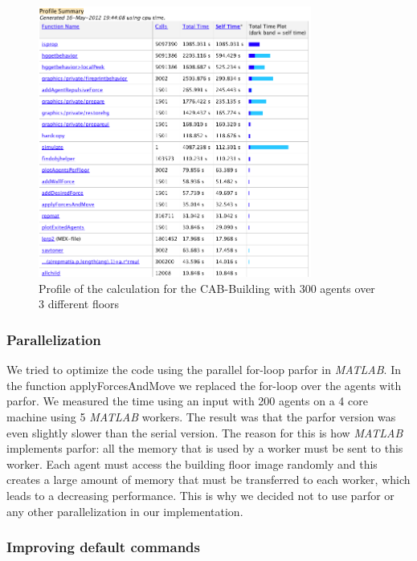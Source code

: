 \documentclass[11pt]{article}
\begin{document}
\begin{figure}[h]
\centering
\includegraphics[width=0.8\textwidth]{./images/profiler.png}
\caption{Profile of the calculation for the CAB-Building with 300 agents over 3 different floors} 
\label{cab profile}
\end{figure}


\subsubsection{Parallelization}

We tried to optimize the code using the parallel for-loop parfor in \textit{MATLAB}. In
the function applyForcesAndMove we replaced the for-loop over the agents with
parfor. We measured the time using an input with 200 agents on a 4 core machine
using 5 \textit{MATLAB} workers. The result was that the parfor version was even slightly
slower than the serial version. The reason for this is how \textit{MATLAB} implements
parfor: all the memory that is used by a worker must be sent to this worker.
Each agent must access the building floor image randomly and this creates a
large amount of memory that must be transferred to each worker, which leads to a
decreasing performance.
This is why we decided not to use parfor or any other parallelization in our
implementation.


\subsubsection{Improving default commands}
\end{document}
